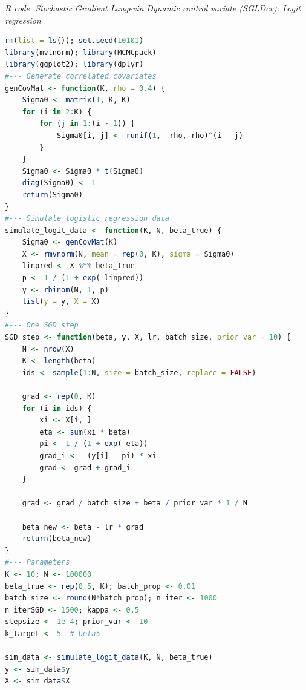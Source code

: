 \begin{enumerate}[leftmargin=*]
\begin{tcolorbox}[enhanced,width=4.67in,center upper,
	fontupper=\large\bfseries,drop shadow southwest,sharp corners]
	\textit{R code. Stochastic Gradient Langevin Dynamic control variate (SGLDcv): Logit regression}
	\begin{VF}
		\begin{lstlisting}[language=R]
rm(list = ls()); set.seed(10101)
library(mvtnorm); library(MCMCpack)
library(ggplot2); library(dplyr)
#--- Generate correlated covariates
genCovMat <- function(K, rho = 0.4) {
	Sigma0 <- matrix(1, K, K)
	for (i in 2:K) {
		for (j in 1:(i - 1)) {
			Sigma0[i, j] <- runif(1, -rho, rho)^(i - j)
		}
	}
	Sigma0 <- Sigma0 * t(Sigma0)
	diag(Sigma0) <- 1
	return(Sigma0)
}
#--- Simulate logistic regression data
simulate_logit_data <- function(K, N, beta_true) {
	Sigma0 <- genCovMat(K)
	X <- rmvnorm(N, mean = rep(0, K), sigma = Sigma0)
	linpred <- X %*% beta_true
	p <- 1 / (1 + exp(-linpred))
	y <- rbinom(N, 1, p)
	list(y = y, X = X)
}
#--- One SGD step
SGD_step <- function(beta, y, X, lr, batch_size, prior_var = 10) {
	N <- nrow(X)
	K <- length(beta)
	ids <- sample(1:N, size = batch_size, replace = FALSE)
	
	grad <- rep(0, K)
	for (i in ids) {
		xi <- X[i, ]
		eta <- sum(xi * beta)
		pi <- 1 / (1 + exp(-eta))
		grad_i <- -(y[i] - pi) * xi
		grad <- grad + grad_i
	}
	
	grad <- grad / batch_size + beta / prior_var * 1 / N 
	
	beta_new <- beta - lr * grad
	return(beta_new)
}
#--- Parameters
K <- 10; N <- 100000
beta_true <- rep(0.5, K); batch_prop <- 0.01
batch_size <- round(N*batch_prop); n_iter <- 1000
n_iterSGD <- 1500; kappa <- 0.5
stepsize <- 1e-4; prior_var <- 10
k_target <- 5  # beta5

sim_data <- simulate_logit_data(K, N, beta_true)
y <- sim_data$y
X <- sim_data$X
\end{lstlisting}
	\end{VF}
\end{tcolorbox}



\end{enumerate}
